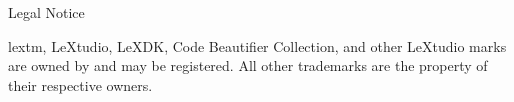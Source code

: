 \begin{center}
Legal Notice
\end{center}
lextm, 
LeXtudio, 
LeXDK,
Code Beautifier Collection, 
and other LeXtudio marks are owned by \lextm and may be registered. 
All other trademarks are the property of their respective owners.
